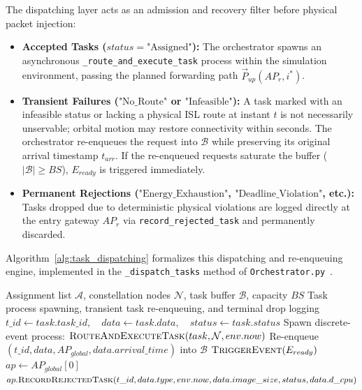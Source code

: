 The dispatching layer acts as an admission and recovery filter before physical packet injection:
\begin{itemize}
    \item \textbf{Accepted Tasks ($status = \text{"Assigned"}$):} The orchestrator spawns an asynchronous \texttt{\_route\_and\_execute\_task} process within the simulation environment, passing the planned forwarding path $\vec{P}_{up}(AP_r, i^*)$.
    \item \textbf{Transient Failures ($\text{"No\_Route"}$ or $\text{"Infeasible"}$):} A task marked with an infeasible status or lacking a physical ISL route at instant $t$ is not necessarily unservable; orbital motion may restore connectivity within seconds. The orchestrator re-enqueues the request into $\mathcal{B}$ while preserving its original arrival timestamp $t_{arr}$. If the re-enqueued requests saturate the buffer ($|\mathcal{B}| \ge BS$), $E_{ready}$ is triggered immediately.
    \item \textbf{Permanent Rejections ($\text{"Energy\_Exhaustion"}$, $\text{"Deadline\_Violation"}$, etc.):} Tasks dropped due to deterministic physical violations are logged directly at the entry gateway $AP_r$ via \texttt{record\_rejected\_task} and permanently discarded.
\end{itemize}

Algorithm~\ref{alg:task_dispatching} formalizes this dispatching and re-enqueuing engine, implemented in the \texttt{\_dispatch\_tasks} method of \texttt{Orchestrator.py}~\cite{bagini_repo_2026}.

\begin{algorithm}[H]
\caption{Task Dispatching, Re-Enqueuing, and Drop Accounting}
\label{alg:task_dispatching}
\small
\begin{algorithmic}[1]
\Require Assignment list $\mathcal{A}$, constellation nodes $\mathcal{N}$, task buffer $\mathcal{B}$, capacity $BS$
\Ensure Task process spawning, transient task re-enqueuing, and terminal drop logging
    \State $t\_id \gets task.task\_id, \quad data \gets task.data, \quad status \gets task.status$
        \State Spawn discrete-event process: $\Call{RouteAndExecuteTask}{task, \mathcal{N}, env.now}$
     
        \State Re-enqueue $(t\_id, data, AP_{global}, data.arrival\_time)$ into $\mathcal{B}$
            \State $\Call{TriggerEvent}{E_{ready}}$ 
        \EndIf
    \Else {}
        \State $ap \gets AP_{global}[0]$
        \State $ap.\Call{RecordRejectedTask}{t\_id, data.type, env.now, data.image\_size, status, data.d\_cpu}$
    \EndIf
\EndFor
\end{algorithmic}
\end{algorithm}
\FloatBarrier

